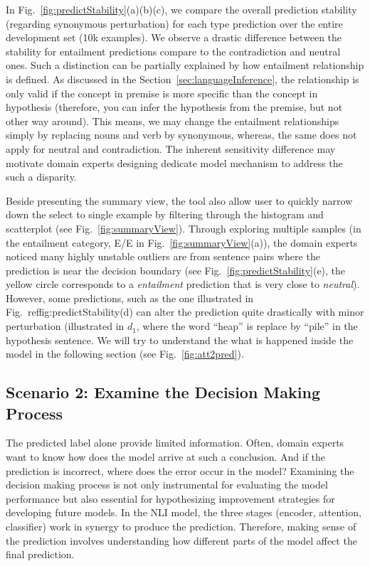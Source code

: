 In Fig.~\ref{fig:predictStability}(a)(b)(c),  %
we compare the overall prediction stability (regarding synonymous perturbation) for each type prediction over the entire development set (10k examples).
%
We observe a drastic difference between the stability for entailment predictions compare to the contradiction and neutral ones.
%
Such a distinction can be partially explained by how entailment relationship is defined. As discussed in the Section~\ref{sec:languageInference}, the relationship is only valid if the concept in premise is more specific than the concept in hypothesis (therefore, you can infer the hypothesis from the premise, but not other way around). This means, we may change the entailment relationships simply by replacing nouns and verb by synonymous, whereas, the same does not apply for neutral and contradiction.
%
The inherent sensitivity difference may motivate domain experts designing dedicate model mechanism to address the such a disparity.

Beside presenting the summary view, the tool also allow user to quickly narrow down the select to single example  by filtering through the histogram and scatterplot (see Fig.~\ref{fig:summaryView}).
%
Through exploring multiple samples (in the entailment category, E/E in Fig.~\ref{fig:summaryView}(a)), the domain experts noticed many highly unstable outliers are from sentence pairs where the prediction is near the decision boundary (see Fig.~\ref{fig:predictStability}(e), the yellow circle corresponds to a \emph{entailment} prediction that is very close to \emph{neutral}).
However, some predictions, such as the one illustrated in Fig.~ref{fig:predictStability}(d) can alter the prediction quite drastically with minor perturbation (illustrated in $d_1$, where the word ``heap'' is replace by ``pile'' in the hypothesis sentence. We will try to understand the what is happened inside the model in the following section (see Fig.~\ref{fig:att2pred}).

\subsection{Scenario 2: Examine the Decision Making Process}
The predicted label alone provide limited information. Often, domain experts want to know how does the model arrive at such a conclusion. And if the prediction is incorrect, where does the error occur in the model?
%
Examining the decision making process is not only instrumental for evaluating the model performance but also essential for hypothesizing improvement strategies for developing future models.
%
In the NLI model, the three stages (encoder, attention, classifier) work in synergy to produce the prediction.
Therefore, making sense of the prediction involves understanding how different parts of the model affect the final prediction.

